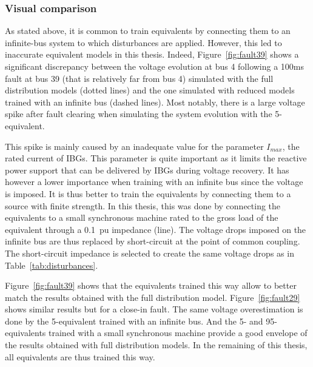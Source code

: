 \subsubsection{Visual comparison}
\label{sec:isgt_results_visual}

As stated above, it is common to train equivalents by connecting them to an infinite-bus system to which disturbances are applied. However, this led to inaccurate equivalent models in this thesis. Indeed, Figure~\ref{fig:fault39} shows a significant discrepancy between the voltage evolution at bus 4 following a 100ms fault at bus 39 (that is relatively far from bus 4) simulated with the full distribution models (dotted lines) and the one simulated with reduced models trained with an infinite bus (dashed lines). Most notably, there is a large voltage spike after fault clearing when simulating the system evolution with the 5-equivalent.

This spike is mainly caused by an inadequate value for the parameter \(I_{max}\), the rated current of IBGs. This parameter is quite important as it limits the reactive power support that can be delivered by IBGs during voltage recovery. It has however a lower importance when training with an infinite bus since the voltage is imposed. It is thus better to train the equivalents by connecting them to a source with finite strength. In this thesis, this was done by connecting the equivalents to a small synchronous machine rated to the gross load of the equivalent through a 0.1~pu impedance (line). The voltage drops imposed on the infinite bus are thus replaced by short-circuit at the point of common coupling. The short-circuit impedance is selected to create the same voltage drops as in Table~\ref{tab:disturbances}.

Figure~\ref{fig:fault39} shows that the equivalents trained this way allow to better match the results obtained with the full distribution model. Figure~\ref{fig:fault29} shows similar results but for a close-in fault. The same voltage overestimation is done by the 5-equivalent trained with an infinite bus. And the 5- and 95- equivalents trained with a small synchronous machine provide a good envelope of the results obtained with full distribution models. In the remaining of this thesis, all equivalents are thus trained this way.


